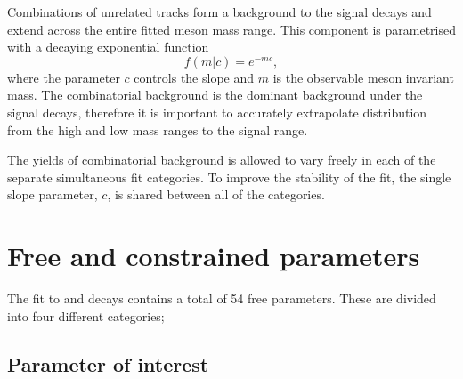 Combinations of unrelated tracks form a background to the signal decays and extend across the entire fitted \Bp meson mass range. 
This component is parametrised with a decaying exponential function 
\begin{equation}
f(m|c) = e^{-mc},
\end{equation}
where the parameter $c$ controls the slope and $m$ is the observable \Bp meson invariant mass. 
The combinatorial background is the dominant background under the signal decays, therefore it is important to accurately extrapolate distribution from the high and low mass ranges to the signal range. 

The yields of combinatorial background is allowed to vary freely in each of the separate simultaneous fit categories. To improve the stability of the fit, the single slope parameter, $c$, is shared between all of the categories. 

\section{Free and constrained parameters}

The fit to \decay{\Bp}{\Dsp\phiz} and \decay{\Bp}{\Dsp\Dzb} decays contains a total of 54 free parameters. 
These are divided into four different categories;


\subsection{Parameter of interest}

